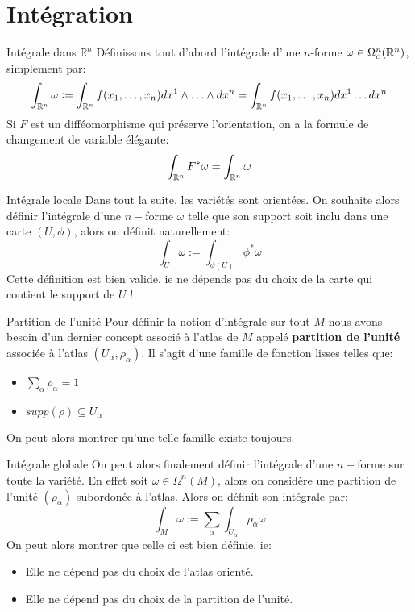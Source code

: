 \documentclass{beamer}
\begin{document}
    \section{Intégration}
        \begin{frame}{Intégrale dans $\mathbb{R}^n$}
            Définissons tout d'abord l'intégrale d'une $n$-forme $\omega \in \Omega^n_c(\mathbb{R}^n)$, simplement par:
            \[
                \int_{\mathbb{R}^n} \omega := \int_{\mathbb{R}^n} f(x_1, \ldots, x_n)dx^1 \wedge \ldots \wedge dx^n = \int_{\mathbb{R}^n} f(x_1, \ldots, x_n)dx^1\ldots dx^n
            \]
            Si $F$ est un difféomorphisme qui préserve l'orientation, on a la formule de changement de variable élégante:
            \[
                \int_{\mathbb{R}^n} F^*\omega = \int_{\mathbb{R}^n} \omega
            \]
        \end{frame}
        \begin{frame}{Intégrale locale}
            Dans tout la suite, les variétés sont orientées. On souhaite alors définir l'intégrale d'une \( n-\)forme \(\omega\)  telle que son support soit inclu dans une carte \( (U, \phi) \), alors on définit naturellement:
            \[
                \int_{U} \omega := \int_{\phi(U)} \phi^* \omega
            \]
            Cette définition est bien valide, ie ne dépends pas du choix de la carte qui contient le support de $U$ !

        \end{frame}
        \begin{frame}{Partition de l'unité}
            Pour définir la notion d'intégrale sur tout $M$ nous avons besoin d'un dernier concept associé à l'atlas de $M$ appelé \textbf{partition de l'unité} associée à l'atlas $(U_\alpha, \rho_\alpha)$. Il s'agit d'une famille de fonction lisses telles que:
            \begin{itemize}
               \item $\sum_\alpha \rho_\alpha = 1$
               \item $supp(\rho) \subseteq U_\alpha$
            \end{itemize}
            On peut alors montrer qu'une telle famille existe toujours.
        \end{frame}
        \begin{frame}{Intégrale globale}
            On peut alors finalement définir l'intégrale d'une \( n-\)forme sur toute la variété. En effet soit \( \omega \in \Omega^n(M) \), alors on considère une partition de l'unité \( (\rho_\alpha) \) subordonée à l'atlas. Alors on définit son intégrale par:
            \[ 
                \int_M \omega := \sum_\alpha \int_{U_\alpha} \rho_\alpha \omega 
            \]
            On peut alors montrer que celle ci est bien définie, ie:
            \begin{itemize}
                \item Elle ne dépend pas du choix de l'atlas orienté.
                \item Elle ne dépend pas du choix de la partition de l'unité.
            \end{itemize}
        \end{frame}
\end{document}
